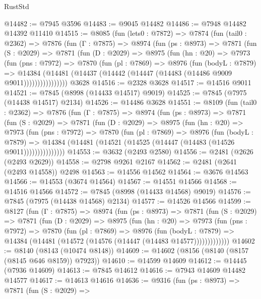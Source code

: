\begin{lexlean}{RustStd}
\begin{coremodule}
@14482 := @7945 @3596
@14483 := @9045 @14482
@14486 := @7948 @14482 @14392 @11410
@14515 := @8085
    (fun (lets0 : @7872) =>
    @7874
      (fun (tail0 : @2362) =>
      @7876
        (fun (Γ : @7875) =>
        @8974
          (fun (ps : @8973) =>
          @7871
            (fun (S : @2029) =>
            @7871
              (fun (D : @2029) =>
              @8975
                (fun (hn : @20) =>
                @7973
                  (fun (pns : @7972) =>
                  @7870
                    (fun (pl : @7869) =>
                    @8976
                      (fun (bodyL : @7879) =>
                      @14384
                        (@14481 (@14437 (@14442 (@14447 (@14483 (@14486 @9009 @9011))))))))))))))))
    @3628
@14516 := @2328 @3628
@14517 := @14516 @9011
@14521 := @7845 (@8998 (@14433 @14517) @9019)
@14525 := @7845 (@7975 (@14438 @14517) @2134)
@14526 := @14486 @3628
@14551 := @8109
    (fun (tail0 : @2362) =>
    @7876
      (fun (Γ : @7875) =>
      @8974
        (fun (ps : @8973) =>
        @7871
          (fun (S : @2029) =>
          @7871
            (fun (D : @2029) =>
            @8975
              (fun (hn : @20) =>
              @7973
                (fun (pns : @7972) =>
                @7870
                  (fun (pl : @7869) =>
                  @8976
                    (fun (bodyL : @7879) =>
                    @14384 (@14481 (@14521 (@14525 (@14447 (@14483 (@14526 @9011)))))))))))))))
@14553 := @3632 (@2493 @2580)
@14556 := @2481 (@2626 (@2493 @2629))
@14558 := @2798 @9261 @2167
@14562 := @2481 (@2641 (@2493 @14558)) @2498
@14563 := @14556 @14562
@14564 := @3676 @14563
@14566 := @14553 (@3674 @14564)
@14567 := @14551 @14566
@14568 := @14516 @14566
@14572 := @7845 (@8998 (@14433 @14568) @9019)
@14576 := @7845 (@7975 (@14438 @14568) @2134)
@14577 := @14526 @14566
@14599 := @8127
    (fun (Γ : @7875) =>
    @8974
      (fun (ps : @8973) =>
      @7871
        (fun (S : @2029) =>
        @7871
          (fun (D : @2029) =>
          @8975
            (fun (hn : @20) =>
            @7973
              (fun (pns : @7972) =>
              @7870
                (fun (pl : @7869) =>
                @8976
                  (fun (bodyL : @7879) =>
                  @14384 (@14481 (@14572 (@14576 (@14447 (@14483 @14577)))))))))))))
@14602 := @8140 (@8143 (@10474 @8148))
@14609 := @14602 (@8156 (@8140 (@8157 (@8145 @646 @8159)) @7923))
@14610 := @14599 @14609
@14612 := @14445 (@7936 @14609)
@14613 := @7845 @14612
@14616 := @7943 @14609 @14482 @14577
@14617 := @14613 @14616
@14636 := @9316
    (fun (ps : @8973) =>
    @7871
      (fun (S : @2029) =>

\end{coremodule}
\end{lexlean}
